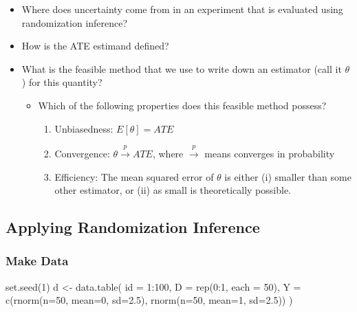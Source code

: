 \documentclass[
]{article}
\newenvironment{Shaded}{\begin{snugshade}}{\end{snugshade}}
\newcommand{\AttributeTok}[1]{\textcolor[rgb]{0.77,0.63,0.00}{#1}}
\newcommand{\DecValTok}[1]{\textcolor[rgb]{0.00,0.00,0.81}{#1}}
\newcommand{\FloatTok}[1]{\textcolor[rgb]{0.00,0.00,0.81}{#1}}
\newcommand{\FunctionTok}[1]{\textcolor[rgb]{0.00,0.00,0.00}{#1}}
\newcommand{\NormalTok}[1]{#1}
\newcommand{\OtherTok}[1]{\textcolor[rgb]{0.56,0.35,0.01}{#1}}
\newcommand{\SpecialCharTok}[1]{\textcolor[rgb]{0.00,0.00,0.00}{#1}}
\providecommand{\tightlist}{%
  \setlength{\itemsep}{0pt}\setlength{\parskip}{0pt}}
\begin{document}
\begin{itemize}
\tightlist
\item
  Where does uncertainty come from in an experiment that is evaluated using randomization inference?
\item
  How is the ATE estimand defined?
\item
  What is the feasible method that we use to write down an estimator (call it \(\theta\)) for this quantity?

  \begin{itemize}
  \tightlist
  \item
    Which of the following properties does this feasible method possess?

    \begin{enumerate}
    \def\labelenumi{\alph{enumi}.}
    \tightlist
    \item
      Unbiasedness: \(E[\theta] = ATE\)
    \item
      Convergence: \(\theta \overset{p}\rightarrow ATE\), where \(\overset{p}\rightarrow\) means converges in probability
    \item
      Efficiency: The mean squared error of \(\theta\) is either (i) smaller than some other estimator, or (ii) as small is theoretically possible.
    \end{enumerate}
  \end{itemize}
\end{itemize}

\hypertarget{applying-randomization-inference}{%
\subsection{Applying Randomization Inference}\label{applying-randomization-inference}}

\hypertarget{make-data}{%
\subsubsection{Make Data}\label{make-data}}

\begin{Shaded}
\begin{Highlighting}[]
\FunctionTok{set.seed}\NormalTok{(}\DecValTok{1}\NormalTok{)}
\NormalTok{d }\OtherTok{\textless{}{-}} \FunctionTok{data.table}\NormalTok{(}
  \AttributeTok{id =} \DecValTok{1}\SpecialCharTok{:}\DecValTok{100}\NormalTok{, }
  \AttributeTok{D  =} \FunctionTok{rep}\NormalTok{(}\DecValTok{0}\SpecialCharTok{:}\DecValTok{1}\NormalTok{, }\AttributeTok{each =} \DecValTok{50}\NormalTok{), }
  \AttributeTok{Y  =} \FunctionTok{c}\NormalTok{(}\FunctionTok{rnorm}\NormalTok{(}\AttributeTok{n=}\DecValTok{50}\NormalTok{, }\AttributeTok{mean=}\DecValTok{0}\NormalTok{, }\AttributeTok{sd=}\FloatTok{2.5}\NormalTok{), }\FunctionTok{rnorm}\NormalTok{(}\AttributeTok{n=}\DecValTok{50}\NormalTok{, }\AttributeTok{mean=}\DecValTok{1}\NormalTok{, }\AttributeTok{sd=}\FloatTok{2.5}\NormalTok{))}
\NormalTok{)}
\end{Highlighting}
\end{Shaded}
\end{document}
